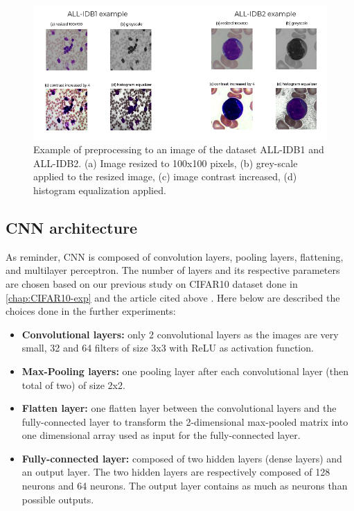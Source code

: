 \documentclass[11pt, openany]{report}
\theoremstyle{plain}
\theoremstyle{definition}
\theoremstyle{remark}
\begin{document}
\begin{figure}[H]
  \centering
  \includegraphics[scale=0.6]{figures/preproc-leuk.PNG}
  \caption{Example of preprocessing to an image of the dataset ALL-IDB1 and ALL-IDB2. (a) Image resized to 100x100 pixels, (b) grey-scale applied to the resized image, (c) image contrast increased, (d) histogram equalization applied.}
  \label{fig:preproc-leuk}
\end{figure}

\subsection{CNN architecture}
As reminder, CNN is composed of convolution layers, pooling layers, flattening, and
multilayer perceptron. The number of layers and its respective parameters are chosen based on our previous study on CIFAR10 dataset done in \autoref{chap:CIFAR10-exp} and the article cited above \cite{leukemia}. Here below are described the choices done in the further experiments: 

\begin{itemize}
\item \textbf{Convolutional layers:} only 2 convolutional layers as the images are very small, 32 and 64 filters of size 3x3 with ReLU as activation function.  

\item \textbf{Max-Pooling layers:} one pooling layer after each convolutional layer (then total of two) of size 2x2. 

\item \textbf{Flatten layer:} one flatten layer between the convolutional layers and the fully-connected layer to transform the 2-dimensional max-pooled matrix into one dimensional array used as input for the fully-connected layer. 

\item \textbf{Fully-connected layer:} composed of two hidden layers (dense layers) and an output layer. The two hidden layers are respectively composed of 128 neurons and 64 neurons. The output layer contains as much as neurons than possible outputs.  
\end{itemize}
\end{document}
